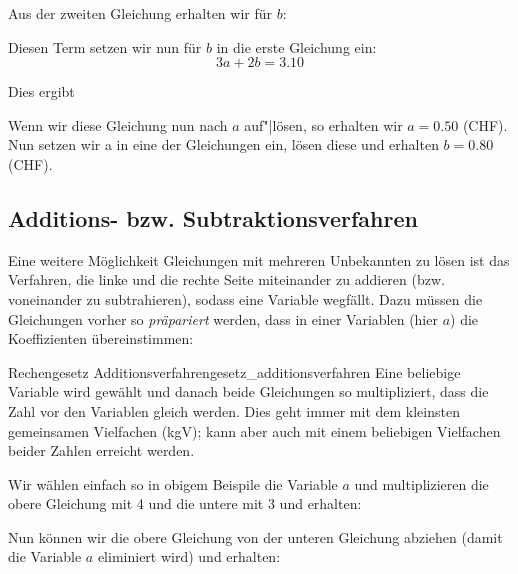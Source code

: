 
Aus der zweiten Gleichung erhalten wir für $b$:


Diesen Term setzen wir nun für $b$ in die erste Gleichung ein:
$$3a+2b = 3.10$$

Dies ergibt


Wenn wir diese Gleichung nun nach $a$ auf"|lösen, so erhalten wir $a = 0.50$ (CHF).
Nun setzen wir a in eine der Gleichungen ein, lösen diese und erhalten $b = 0.80$ (CHF).


\newpage
\subsection{Additions- bzw. Subtraktionsverfahren}
Eine weitere Möglichkeit Gleichungen mit mehreren Unbekannten zu lösen ist das Verfahren, die linke und die rechte Seite miteinander zu addieren (bzw. voneinander zu subtrahieren), sodass eine Variable wegfällt. Dazu müssen die Gleichungen vorher so \textit{präpariert} werden, dass in einer Variablen (hier \zB $a$) die Koeffizienten übereinstimmen:


  \begin{rezept}{Rechengesetz Additionsverfahren}{gesetz_additionsverfahren}
    Eine beliebige Variable wird gewählt und danach beide Gleichungen so multipliziert,
    dass die Zahl vor den Variablen gleich werden. Dies geht immer mit
    dem kleinsten gemeinsamen Vielfachen (kgV); kann aber auch mit
    einem beliebigen Vielfachen beider Zahlen erreicht werden.
  \end{rezept}

Wir wählen einfach so in obigem Beispile die Variable $a$ und multiplizieren die obere Gleichung mit 4 und die untere mit 3 und
erhalten:


Nun können wir die obere Gleichung von der unteren Gleichung abziehen (damit die Variable $a$ eliminiert wird)
und erhalten:

